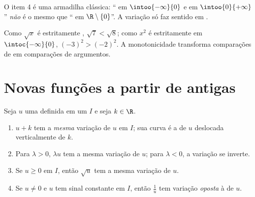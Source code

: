 \begin{remark}
O item 4 é uma armadilha clássica: `` em $\intoo{-\infty}{0}$
e em $\intoo{0}{+\infty}$'' \emph{não} é o mesmo que `` em
$\R \setminus \{0\}$''. A variação só faz sentido em .
\end{remark}

\begin{example}
Como $\sqrt x$ é estritamente , $\sqrt{7} < \sqrt{8}$; como
$x^2$ é estritamente  em $\intoc{-\infty}{0}$,
$(-3)^2 > (-2)^2$. A monotonicidade transforma comparações de  em
comparações de argumentos.
\end{example}

\section{Novas funções a partir de antigas}

\begin{proposition}[Transformações]\label{prop:g11:func:transforms}
Seja $u$ uma  definida em um  $I$ e seja $k \in \R$.
\begin{enumerate}
  \item $u + k$ tem a \emph{mesma} variação de $u$ em $I$; sua curva é a
        de $u$ deslocada verticalmente de $k$.
  \item Para $\lambda > 0$, $\lambda u$ tem a mesma variação de $u$; para
        $\lambda < 0$, a variação se inverte.
  \item Se $u \geq 0$ em $I$, então $\sqrt u$ tem a mesma variação de
        $u$.
  \item Se $u \neq 0$ e $u$ tem sinal constante em $I$, então $\frac1u$
        tem variação \emph{oposta} à de $u$.
\end{enumerate}
\end{proposition}

